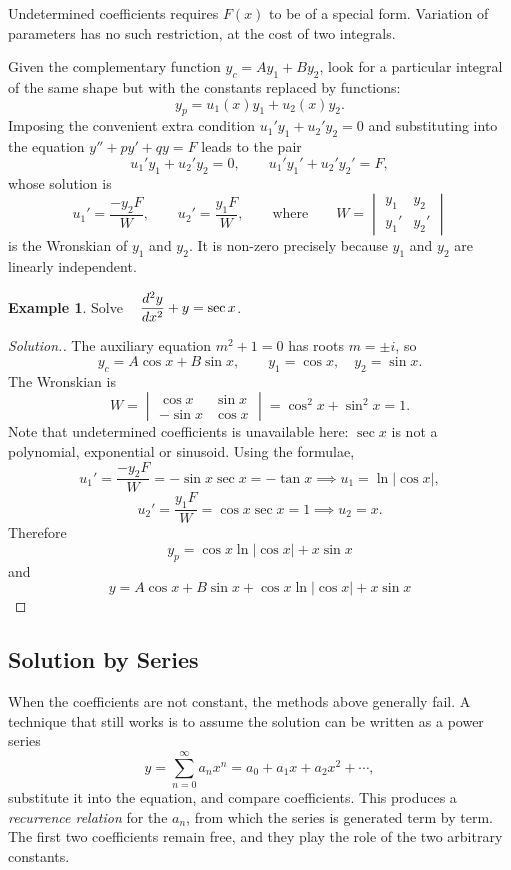 \documentclass[11pt,a4paper]{article}
\theoremstyle{definition}
\newtheorem{exa}[thm]{Example}
\newenvironment{solution}
  {\renewcommand{\qedsymbol}{}\begin{proof}[\textit{Solution}.]}
  {\end{proof}}
\begin{document}
Undetermined coefficients requires $F(x)$ to be of a special form. Variation of
parameters has no such restriction, at the cost of two integrals.

Given the complementary function $y_c = Ay_1 + By_2$, look for a particular
integral of the same shape but with the constants replaced by functions:
$$y_p = u_1(x)y_1 + u_2(x)y_2 .$$
Imposing the convenient extra condition $u_1'y_1 + u_2'y_2 = 0$ and substituting
into the equation $y'' + py' + qy = F$ leads to the pair
$$u_1'y_1 + u_2'y_2 = 0,\qquad u_1'y_1' + u_2'y_2' = F ,$$
whose solution is
$$\boxed{u_1' = \frac{-y_2F}{W},\qquad u_2' = \frac{y_1F}{W}},
\qquad\text{where}\qquad
W = \begin{vmatrix} y_1 & y_2\\ y_1' & y_2'\end{vmatrix}$$
is the Wronskian of $y_1$ and $y_2$. It is non-zero precisely because $y_1$ and
$y_2$ are linearly independent.

\begin{exa}
Solve $\hspace{0.3cm}\dfrac{d^2y}{dx^2} + y = \sec x$.
\end{exa}

\begin{solution}
The auxiliary equation $m^2 + 1 = 0$ has roots $m = \pm i$, so
$$y_c = A\cos x + B\sin x ,\qquad y_1 = \cos x,\quad y_2 = \sin x .$$
The Wronskian is
$$W = \begin{vmatrix} \cos x & \sin x\\ -\sin x & \cos x\end{vmatrix}
= \cos^2x + \sin^2x = 1 .$$
Note that undetermined coefficients is unavailable here: $\sec x$ is not a
polynomial, exponential or sinusoid. Using the formulae,
$$u_1' = \frac{-y_2F}{W} = -\sin x\sec x = -\tan x
\implies u_1 = \ln\left|\cos x\right| ,$$
$$u_2' = \frac{y_1F}{W} = \cos x\sec x = 1 \implies u_2 = x .$$
Therefore
$$y_p = \cos x\ln\left|\cos x\right| + x\sin x$$
and
$$\boxed{y = A\cos x + B\sin x + \cos x\ln\left|\cos x\right| + x\sin x}$$
\end{solution}

\subsection{Solution by Series}

When the coefficients are not constant, the methods above generally fail. A
technique that still works is to assume the solution can be written as a power
series
$$y = \sum_{n=0}^{\infty}a_nx^n = a_0 + a_1x + a_2x^2 + \cdots ,$$
substitute it into the equation, and compare coefficients. This produces a
\emph{recurrence relation} for the $a_n$, from which the series is generated
term by term. The first two coefficients remain free, and they play the role of
the two arbitrary constants.
\end{document}
